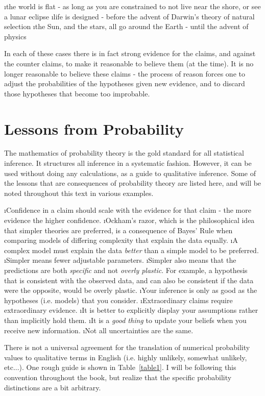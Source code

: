\be
\i the world is flat - as long as you are constrained to not live near the shore, or see a lunar eclipse
\i life is designed - before the advent of Darwin's theory of natural selection
\i the Sun, and the stars, all go around the Earth - until the advent of physics
\ee

In each of these cases there is in fact strong evidence for the claims, and against the counter claims, to make it reasonable to believe them (at the time).  It is no longer reasonable to believe these claims - the process of reason forces one to adjust the probabilities of the hypotheses given new evidence, and to discard those hypotheses that become too improbable.


\section{Lessons from Probability}
The mathematics of probability theory is the gold standard for all statistical inference.  It structures all inference in a systematic fashion.  However, it can be used without doing any calculations, as a guide to qualitative inference.  Some of the lessons that are consequences of probability theory are listed here, and will be noted throughout this text in various examples.

\bi
\i Confidence in a claim should scale with the evidence for that claim - the more evidence the higher confidence.
\i Ockham's razor, which is the philosophical idea that simpler theories are preferred, is a consequence of Bayes' Rule when comparing models of differing complexity that explain the data equally.
\i A complex model must explain the data \emph{better} than a simple model to be preferred.
\i Simpler means fewer adjustable parameters.
\i Simpler also means that the predictions are both {\em specific} and not {\em overly plastic}. For example, a hypothesis that is consistent with the observed data, and can also be consistent if the data were the opposite, would be overly plastic.
\i Your inference is only as good as the hypotheses (i.e. models) that you consider.
\i Extraordinary claims require extraordinary evidence.\cite{sagandemon}
\i It is better to explicitly display your assumptions rather than implicitly hold them.
\i It is a {\em good thing} to update your beliefs when you receive new information.
\i Not all uncertainties are the same.
\ei


There is not a universal agreement for the translation of numerical probability values to qualitative terms in English (i.e. highly unlikely, somewhat unlikely, etc...).  One rough guide is shown in Table~\ref{table1}.  I will be following this convention throughout the book, but realize that the specific probability distinctions are a bit arbitrary.


